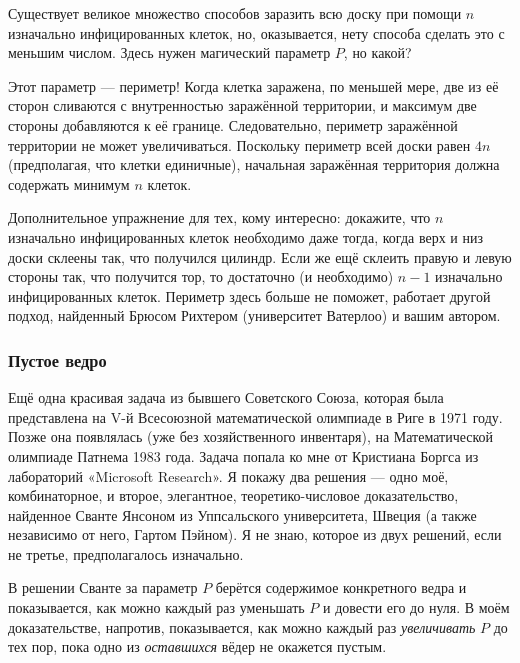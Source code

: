 Существует великое множество способов заразить всю доску при помощи $n$ изначально инфицированных клеток, но, оказывается, нету способа сделать это с меньшим числом.
Здесь нужен магический параметр $P$, но какой?

Этот параметр --- периметр!
Когда клетка заражена, по меньшей мере, две из её сторон сливаются с внутренностью заражённой территории, и максимум две стороны добавляются к её границе.
Следовательно, периметр заражённой территории не может увеличиваться.
Поскольку периметр всей доски равен $4n$ (предполагая, что клетки единичные), начальная заражённая территория должна содержать минимум $n$ клеток.
\heart

Дополнительное упражнение для тех, кому интересно: докажите, что $n$ изначально инфицированных клеток необходимо даже тогда, когда верх и низ доски склеены так, что получился цилиндр.
Если же ещё склеить правую и левую стороны так, что получится тор, то достаточно (и необходимо) $n-1$ изначально инфицированных клеток.
Периметр здесь больше не поможет,
работает другой подход, найденный Брюсом Рихтером (университет Ватерлоо) %
и вашим автором.

\subsubsection*{Пустое ведро}%

Ещё одна красивая задача из бывшего Советского Союза, которая была представлена на V-й Всесоюзной математической олимпиаде в Риге в 1971 году.
Позже она появлялась (уже без хозяйственного инвентаря), на Математической олимпиаде Патнема 1983 года.
Задача попала ко мне от Кристиана Боргса из лабораторий «Microsoft Research». %
Я покажу два решения --- одно моё, комбинаторное, и второе, элегантное, теоретико-числовое доказательство, найденное Сванте Янсоном из Уппсальского университета, Швеция %
(а также независимо от него, Гартом Пэйном). %
Я не знаю, которое из двух решений, если не третье, предполагалось изначально.

\medskip

В решении Сванте за параметр $P$ берётся содержимое конкретного ведра и показывается, как можно каждый раз уменьшать $P$ и довести его до нуля.
В моём доказательстве, напротив, показывается, как можно каждый раз \emph{увеличивать} $P$ до тех пор, пока одно из \emph{оставшихся} вёдер не окажется пустым.

